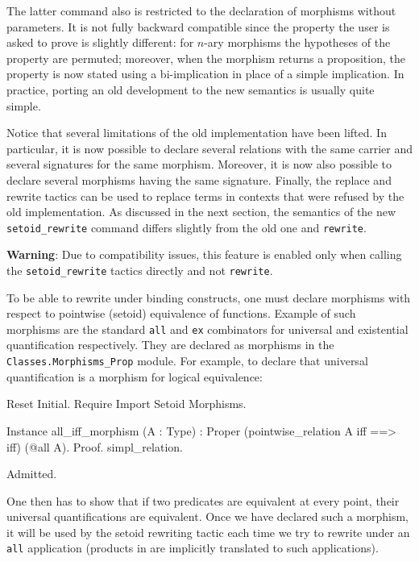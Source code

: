 The latter command also is restricted to the declaration of morphisms without
parameters. It is not fully backward compatible since the property the user
is asked to prove is slightly different: for $n$-ary morphisms the hypotheses
of the property are permuted; moreover, when the morphism returns a
proposition, the property is now stated using a bi-implication in place of
a simple implication. In practice, porting an old development to the new
semantics is usually quite simple.

Notice that several limitations of the old implementation have been lifted.
In particular, it is now possible to declare several relations with the
same carrier and several signatures for the same morphism. Moreover, it is
now also possible to declare several morphisms having the same signature.
Finally, the replace and rewrite tactics can be used to replace terms in
contexts that were refused by the old implementation. As discussed in
the next section, the semantics of the new \texttt{setoid\_rewrite}
command differs slightly from the old one and \texttt{rewrite}.


\textbf{Warning}: Due to compatibility issues, this feature is enabled only when calling 
the \texttt{setoid\_rewrite} tactics directly and not \texttt{rewrite}.

To be able to rewrite under binding constructs, one must declare
morphisms with respect to pointwise (setoid) equivalence of functions. 
Example of such morphisms are the standard \texttt{all} and \texttt{ex}
combinators for universal and existential quantification respectively. 
They are declared as morphisms in the \texttt{Classes.Morphisms\_Prop}
module. For example, to declare that universal quantification is a
morphism for logical equivalence:

\begin{coq_eval}
Reset Initial.
Require Import Setoid Morphisms.
\end{coq_eval}
\begin{coq_example}
Instance all_iff_morphism (A : Type) :
  Proper (pointwise_relation A iff ==> iff) (@all A).
Proof. simpl_relation. 
\end{coq_example}
\begin{coq_eval}
Admitted.
\end{coq_eval}

One then has to show that if two predicates are equivalent at every
point, their universal quantifications are equivalent. Once we have
declared such a morphism, it will be used by the setoid rewriting tactic
each time we try to rewrite under an \texttt{all} application (products
in \Prop{} are implicitly translated to such applications).

